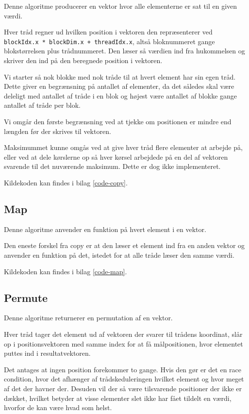 Denne algoritme producerer en vektor hvor alle elementerne er sat til
en given værdi. 

Hver tråd regner ud hvilken position i vektoren den
repræsenterer ved \verb|blockIdx.x * blockDim.x + threadIdx.x|, altså 
bloknummeret gange blokstørrelsen plus trådnummeret.
Den læser så værdien ind fra hukommelsen og skriver den ind på den
beregnede position i vektoren.

Vi starter så nok blokke med nok tråde til at hvert element har sin egen 
tråd. Dette giver en begrænsning på antallet af elementer, da det således
skal være deleligt med antallet af tråde i en blok og højest være antallet
af blokke gange antallet af tråde per blok.

Vi omgår den første begrænsning ved at tjekke om positionen er mindre end 
længden før der skrives til vektoren.

Maksimummet kunne omgås ved at give hver tråd flere elementer at arbejde
på, eller ved at dele kørslerne op så hver kørsel arbejdede på en del af
vektoren svarende til det nuværende maksimum. 
Dette er dog ikke implementeret.

Kildekoden kan findes i bilag \ref{code-copy}.

\subsection{Map}

Denne algoritme anvender en funktion på hvert element i en vektor.

Den eneste forskel fra copy er at den læser et element ind fra en anden
vektor og anvender en funktion på det, istedet for at alle tråde læser 
den samme værdi.

Kildekoden kan findes i bilag \ref{code-map}.

\subsection{Permute}

Denne algoritme returnerer en permutation af en vektor.

Hver tråd tager det element ud af vektoren der svarer til trådens koordinat,
slår op i positionsvektoren med samme index for at få målpositionen, 
hvor elementet puttes ind i resultatvektoren.

Det antages at ingen position forekommer to gange. Hvis den gør er det
en race condition, hvor det afhænger af trådskeduleringen hvilket element 
og hvor meget af det der havner der. Desuden vil der så være tilsvarende 
positioner der ikke er dækket, hvilket betyder at visse elementer slet ikke
har fået tildelt en værdi, hvorfor de kan være hvad som helst.

